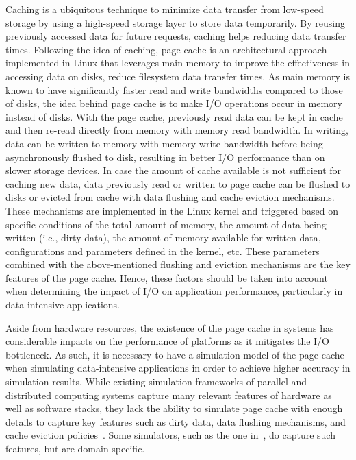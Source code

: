 Caching is a ubiquitous technique to minimize data transfer from 
low-speed storage by using a high-speed storage layer to store data 
temporarily. By reusing previously accessed data for future requests, 
caching helps reducing data transfer times. 
Following the idea of caching, page cache is an architectural approach 
implemented in Linux that leverages main memory to improve the 
effectiveness in accessing data on disks, reduce filesystem data transfer times.
As main memory is known to have significantly faster read and write bandwidths 
compared to those of disks, the idea behind page cache is to make I/O operations 
occur in memory instead of disks.
With the page cache, previously read data can be kept in cache and then re-read 
directly from memory with memory read bandwidth. 
In writing, data can be written to memory with memory write bandwidth 
before being asynchronously flushed to disk, resulting in better I/O performance 
than on slower storage devices. 
In case the amount of cache available is not sufficient for caching new data, 
data previously read or written to page cache can be flushed to disks or 
evicted from cache with data flushing and cache eviction mechanisms. 
These mechanisms are implemented in the Linux kernel and triggered 
based on specific conditions of the total amount of memory, the amount of data 
being written (i.e., dirty data), the amount of memory available for written data, 
configurations and parameters defined in the kernel, etc.
These parameters combined with the above-mentioned flushing and eviction 
mechanisms are the key features of the page cache. 
Hence, these factors should be taken into account when determining the impact 
of I/O on application performance, particularly in data-intensive applications.

Aside from hardware resources, the existence of the page cache in systems has 
considerable impacts on the performance of platforms as it mitigates the I/O 
bottleneck.
As such, it is necessary to have a simulation model of the page cache when 
simulating data-intensive applications in order to achieve higher accuracy  
in simulation results.
While existing simulation frameworks of parallel and distributed computing
systems capture many relevant features of hardware as well as software stacks, 
they lack the ability to simulate page cache with enough details to capture 
key features such as dirty data, data flushing mechanisms, and cache eviction 
policies~\cite{nunez2012simcan,nunez2012icancloud}. 
Some simulators, such as the one in~\cite{xu2018saving}, do capture such 
features, but are domain-specific. 

